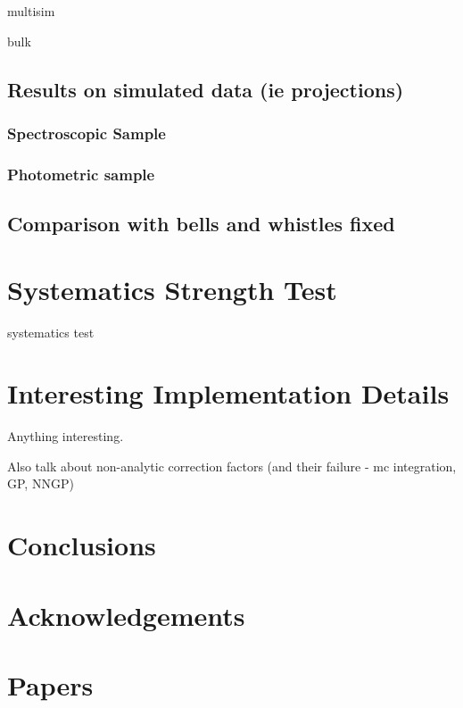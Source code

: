 \documentclass[a4paper,fleqn,usenatbib]{mnras}
\begin{document}
multisim

bulk


\subsection{Results on simulated data (ie projections)}

\subsubsection{Spectroscopic Sample}

\subsubsection{Photometric sample}

\subsection{Comparison with bells and whistles fixed}


\section{Systematics Strength Test}
\label{sec:sys}

systematics test

\section{Interesting Implementation Details}
\label{sec:details}
Anything interesting.

Also talk about non-analytic correction factors (and their failure - mc integration, GP, NNGP)



\section{Conclusions}



\section*{Acknowledgements}














\appendix

\section{Papers}






\bsp	%
\label{lastpage}
\end{document}
